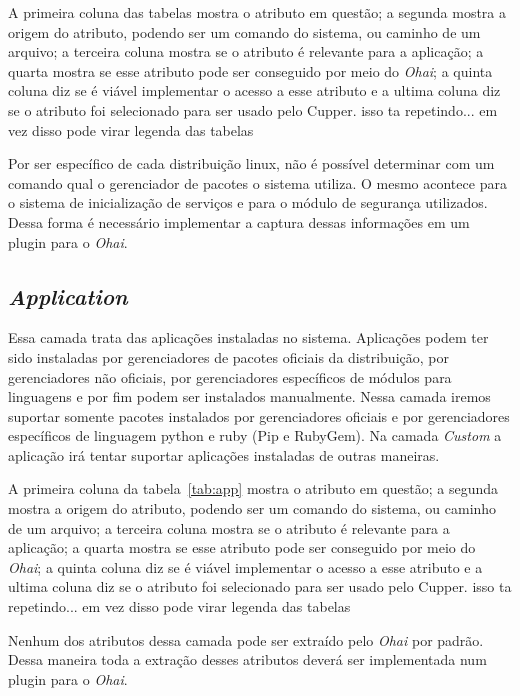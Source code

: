 A primeira coluna das tabelas mostra o atributo em questão; a segunda mostra
a origem do atributo, podendo ser um comando do sistema, ou caminho de um arquivo;
a terceira coluna mostra se o atributo é relevante para a aplicação; a quarta mostra se
esse atributo pode ser conseguido por meio do \textit{Ohai}; a quinta coluna 
diz se é viável implementar o acesso a esse atributo e a ultima coluna
diz se o atributo foi selecionado para ser usado pelo Cupper. {\color{red} isso ta repetindo... em vez disso pode virar legenda das tabelas}


Por ser específico de cada distribuição linux, não é possível determinar com um
comando qual o gerenciador de pacotes o sistema utiliza. O mesmo acontece para
o sistema de inicialização de serviços e para o módulo de segurança utilizados.
Dessa forma é necessário implementar a captura dessas informações em um plugin 
para o \textit{Ohai}.

\subsection{\textit{Application}}

Essa camada trata das aplicações instaladas no sistema. Aplicações podem ter 
sido instaladas por gerenciadores de pacotes oficiais da distribuição, por
gerenciadores não oficiais, por gerenciadores específicos de módulos para
linguagens e por fim podem ser instalados manualmente. Nessa camada iremos 
suportar somente pacotes instalados por gerenciadores oficiais e por 
gerenciadores específicos de linguagem python e ruby (Pip e RubyGem). Na camada
\textit{Custom} a aplicação irá tentar suportar aplicações instaladas de outras
maneiras.

A primeira coluna da tabela~\ref{tab:app} mostra o atributo em questão; a segunda mostra
a origem do atributo, podendo ser um comando do sistema, ou caminho de um arquivo;
a terceira coluna mostra se o atributo é relevante para a aplicação; a quarta mostra se
esse atributo pode ser conseguido por meio do \textit{Ohai}; a quinta coluna 
diz se é viável implementar o acesso a esse atributo e a ultima coluna
diz se o atributo foi selecionado para ser usado pelo Cupper. {\color{red} isso ta repetindo... em vez disso pode virar legenda das tabelas}



Nenhum dos atributos dessa camada pode ser extraído pelo \textit{Ohai} por
padrão. Dessa maneira toda a extração desses atributos deverá ser implementada
num plugin para o \textit{Ohai}.

